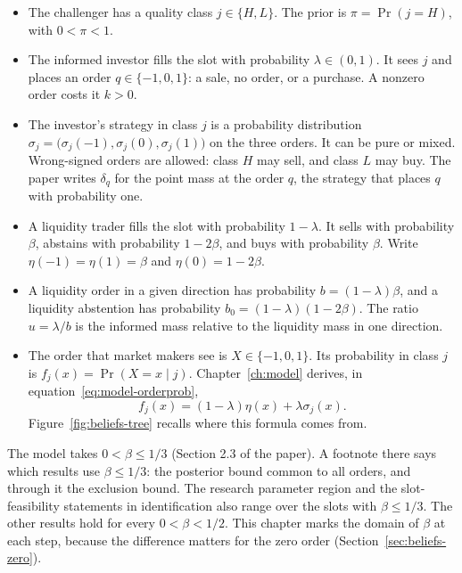 \begin{itemize}
\item The challenger has a quality class \(j\in\{H,L\}\). The prior is \(\pi=\Pr(j=H)\), with \(0<\pi<1\).
\item The informed investor fills the slot with probability \(\lambda\in(0,1)\). It sees \(j\) and places an order \(q\in\{-1,0,1\}\): a sale, no order, or a purchase. A nonzero order costs it \(k>0\).
\item The investor's strategy in class \(j\) is a probability distribution \(\sigma_j=\bigl(\sigma_j(-1),\sigma_j(0),\sigma_j(1)\bigr)\) on the three orders. It can be pure or mixed. Wrong-signed orders are allowed: class \(H\) may sell, and class \(L\) may buy. The paper writes \(\delta_q\) for the point mass at the order \(q\), the strategy that places \(q\) with probability one.
\item A liquidity trader fills the slot with probability \(1-\lambda\). It sells with probability \(\beta\), abstains with probability \(1-2\beta\), and buys with probability \(\beta\). Write \(\eta(-1)=\eta(1)=\beta\) and \(\eta(0)=1-2\beta\).
\item A liquidity order in a given direction has probability \(b=(1-\lambda)\beta\), and a liquidity abstention has probability \(b_0=(1-\lambda)(1-2\beta)\). The ratio \(u=\lambda/b\) is the informed mass relative to the liquidity mass in one direction.
\item The order that market makers see is \(X\in\{-1,0,1\}\). Its probability in class \(j\) is \(f_j(x)=\Pr(X=x\mid j)\). Chapter~\ref{ch:model} derives, in equation~\eqref{eq:model-orderprob},
\[
f_j(x)=(1-\lambda)\eta(x)+\lambda\sigma_j(x).
\]
Figure~\ref{fig:beliefs-tree} recalls where this formula comes from.
\end{itemize}

The model takes \(0<\beta\le1/3\) (Section 2.3 of the paper). A footnote there says which results use \(\beta\le1/3\): the posterior bound common to all orders, and through it the exclusion bound. The research parameter region and the slot-feasibility statements in identification also range over the slots with \(\beta\le1/3\). The other results hold for every \(0<\beta<1/2\). This chapter marks the domain of \(\beta\) at each step, because the difference matters for the zero order (Section~\ref{sec:beliefs-zero}).

